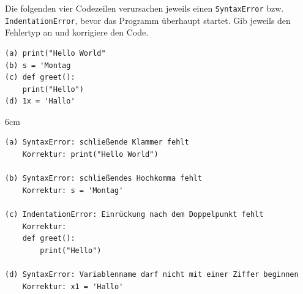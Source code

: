 \question[4]
Die folgenden vier Codezeilen verursachen jeweils einen \texttt{SyntaxError} bzw. \texttt{IndentationError}, 
bevor das Programm überhaupt startet. Gib jeweils den Fehlertyp an und korrigiere den Code.
\begin{lstlisting}
(a) print("Hello World"
(b) s = 'Montag
(c) def greet():
    print("Hello")
(d) 1x = 'Hallo'
\end{lstlisting}

\begin{solutionbox}{6cm}
\begin{lstlisting}[language={}]
(a) SyntaxError: schließende Klammer fehlt
    Korrektur: print("Hello World")

(b) SyntaxError: schließendes Hochkomma fehlt
    Korrektur: s = 'Montag'

(c) IndentationError: Einrückung nach dem Doppelpunkt fehlt
    Korrektur:
    def greet():
        print("Hello")

(d) SyntaxError: Variablenname darf nicht mit einer Ziffer beginnen
    Korrektur: x1 = 'Hallo'
\end{lstlisting}
\end{solutionbox}